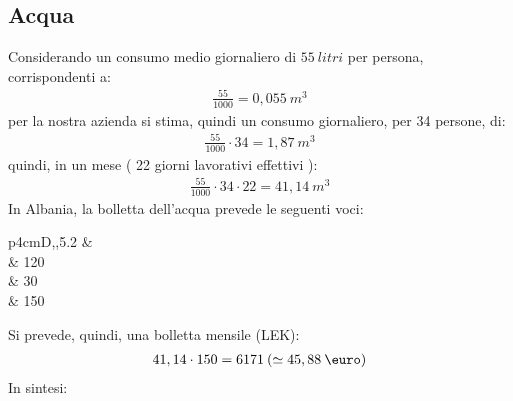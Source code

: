 \subsection[Acqua]{Acqua}
Considerando un consumo medio giornaliero di $ 55 \: litri $ per persona, corrispondenti a:
	\begin{equation}
	\label{eq:consumo_acqua_giorno_dipendente}
	\begin{split}
		\frac{55}{1000} = 0,055 \: m^3
	\end{split}
	\end{equation}	
per la nostra azienda si stima, quindi un consumo giornaliero, per 34 persone, di:
	\begin{equation}
	\label{eq:consumo_acqua_giorno_azienda}
	\begin{split}
		\frac{55}{1000} \cdot 34 = 1,87 \: m^3
	\end{split}
	\end{equation}	
quindi, in un mese ( 22 giorni lavorativi effettivi ):	
	\begin{equation}
	\label{eq:consumo_acqua_giorno_azienda}
	\begin{split}
		\frac{55}{1000} \cdot 34 \cdot 22 = 41,14 \: m^3
	\end{split}
	\end{equation}	
In Albania, la bolletta dell'acqua prevede le seguenti voci:
\begin{savenotes}
\begin{table}[htb]
\centering
 \caption{Costo \si{m^3} acqua}
 \begin{tabular}{p{4cm}D{,}{,}{5.2}}
 \toprule
 	& \\
 \midrule
	 & 120\\
	 & 30\\
	 & 150\\	
 \bottomrule
 \end{tabular} 
\end{table}
\end{savenotes}
Si prevede, quindi, una bolletta mensile (LEK):
	\begin{equation}
	\label{eq:bolletta_acqua_azienda}
	\begin{split}
		41,14 \cdot 150 = 6171 \: ( \simeq 45,88 \: \mbox{\euro}) 
	\end{split}
	\end{equation}	
In sintesi:
